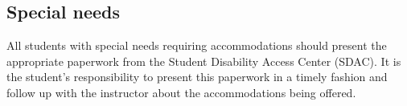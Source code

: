 \documentclass[oneside,11pt]{amsart}
\begin{document}
\subsection{Special needs}

All students with special needs requiring accommodations should present the appropriate paperwork from the Student Disability Access Center (SDAC). It is the student's responsibility to present this paperwork in a timely fashion and follow up with the instructor about the accommodations being offered. 

%
\end{document}
